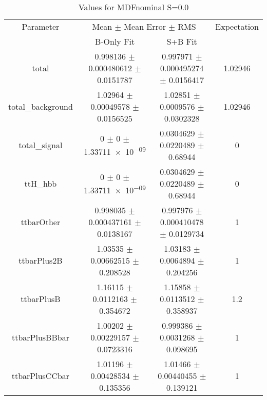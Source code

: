 \begin{table}
\centering
\caption{Values for MDFnominal S=0.0}
\begin{tabular}{cccc}
\toprule
Parameter & \multicolumn{2}{c}{Mean $\pm$ Mean Error $\pm$ RMS} & Expectation\\
 & B-Only Fit & S+B Fit & \\
\midrule
total & \num{0.998136} $\pm$ \num{0.000480612} $\pm$ \num{0.0151787} & \num{0.997971} $\pm$ \num{0.000495274} $\pm$ \num{0.0156417} & \num{1.02946}\\
total\_background & \num{1.02964} $\pm$ \num{0.00049578} $\pm$ \num{0.0156525} & \num{1.02851} $\pm$ \num{0.0009576} $\pm$ \num{0.0302328} & \num{1.02946}\\
total\_signal & \num{0} $\pm$ \num{0} $\pm$ \num{1.33711e-09} & \num{0.0304629} $\pm$ \num{0.0220489} $\pm$ \num{0.68944} & \num{0}\\
ttH\_hbb & \num{0} $\pm$ \num{0} $\pm$ \num{1.33711e-09} & \num{0.0304629} $\pm$ \num{0.0220489} $\pm$ \num{0.68944} & \num{0}\\
ttbarOther & \num{0.998035} $\pm$ \num{0.000437161} $\pm$ \num{0.0138167} & \num{0.997976} $\pm$ \num{0.000410478} $\pm$ \num{0.0129734} & \num{1}\\
ttbarPlus2B & \num{1.03535} $\pm$ \num{0.00662515} $\pm$ \num{0.208528} & \num{1.03183} $\pm$ \num{0.0064894} $\pm$ \num{0.204256} & \num{1}\\
ttbarPlusB & \num{1.16115} $\pm$ \num{0.0112163} $\pm$ \num{0.354672} & \num{1.15858} $\pm$ \num{0.0113512} $\pm$ \num{0.358937} & \num{1.2}\\
ttbarPlusBBbar & \num{1.00202} $\pm$ \num{0.00229157} $\pm$ \num{0.0723316} & \num{0.999386} $\pm$ \num{0.0031268} $\pm$ \num{0.098695} & \num{1}\\
ttbarPlusCCbar & \num{1.01196} $\pm$ \num{0.00428534} $\pm$ \num{0.135356} & \num{1.01466} $\pm$ \num{0.00440455} $\pm$ \num{0.139121} & \num{1}\\
\bottomrule
\end{tabular}
\end{table}